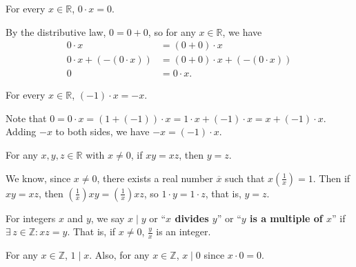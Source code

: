 \documentclass{notes}
\begin{document}
\begin{lem}
  For every $x \in \mathbb R$, $0 \cdot x = 0$.
\end{lem}

\begin{prf}
  By the distributive law, $0 = 0 + 0$, so for any $x \in \mathbb R$, we have 
  \begin{align*}
    0 \cdot x &= (0 + 0) \cdot x \\ 
    0 \cdot x + (-(0 \cdot x)) &= (0 + 0) \cdot x + (-(0 \cdot x)) \\ 
    0 &= 0 \cdot x.
  \end{align*}
\end{prf}

\begin{lem}
  For every $x \in \mathbb R$, $(-1) \cdot x = -x$.
\end{lem}

\begin{prf}
  Note that $0 = 0 \cdot x = (1 + (-1)) \cdot x = 1 \cdot x + (-1) \cdot x = x + (-1) \cdot x$.
  Adding $-x$ to both sides, we have $-x = (-1) \cdot x$.
\end{prf}

\begin{lem}
  For any $x, y, z \in \mathbb R$ with $x \neq 0$, if $x y = x z$, then $y = z$.
\end{lem}

\begin{prf}
  We know, since $x \neq 0$, there exists a real number $\overline x$ such that $x \left ( \frac{1}{x} \right ) = 1$.
  Then if $x y = x z$, then $\left ( \frac{1}{x} \right ) x y = \left ( \frac{1}{x} \right ) x z$, so $1 \cdot y = 1 \cdot z$, that is, $y = z$.
\end{prf}

\underline{}

\begin{defn}
  For integers $x$ and $y$, we say {\boldmath \bfseries $x \mid y$} or ``{\boldmath \bfseries $x$ divides $y$}'' or ``{\boldmath \bfseries $y$ is a multiple of $x$}'' if $\exists \, z \in \mathbb Z: x z = y$.
  That is, if $x \neq 0$, $\frac{y}{x}$ is an integer.
\end{defn}

\begin{rmk}
  For any $x \in \mathbb Z$, $1 \mid x$.
  Also, for any $x \in \mathbb Z$, $x \mid 0$ since $x \cdot 0 = 0$.
\end{rmk}
\end{document}

